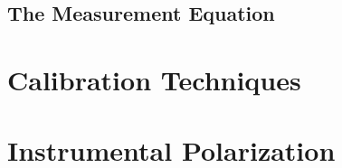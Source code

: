 \subsection{The Measurement Equation}


\section{Calibration Techniques}
\label{sec:interferometry_cal}


\section{Instrumental Polarization}
\label{sec:interferometry_pol}

